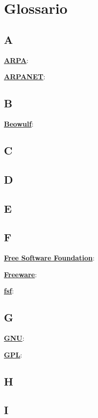 \section{Glossario}

\subsection{A}

\underline{\textbf{ARPA}}: %

\underline{\textbf{ARPANET}}: %

\subsection{B}

\underline{\textbf{Beowulf}}: %

\subsection{C}

\subsection{D}

\subsection{E}

\subsection{F}

\underline{\textbf{Free Software Foundation}}: %

\underline{\textbf{Freeware}}: %

\underline{\textbf{fsf}}: %

\subsection{G}

\underline{\textbf{GNU}}: %

\underline{\textbf{GPL}}: %

\subsection{H}

\subsection{I}

